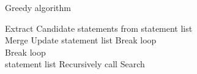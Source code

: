 \documentclass[a4paper]{article}
\begin{document}
\begin{algorithm}
\caption{Greedy algorithm}
\begin{algorithmic}[1]

    \State Extract Candidate statements from statement list
    \\
      
                \State Merge
                \State Update statement list
                \State Break loop
            \EndIf
        \EndFor
        \\
            \State Break loop
        \EndIf
    \EndFor
    \\
        \Return statement list
    \Else
        \State Recursively call Search
    \EndIf
\EndProcedure

\end{algorithmic}
\end{algorithm}
\end{document}
